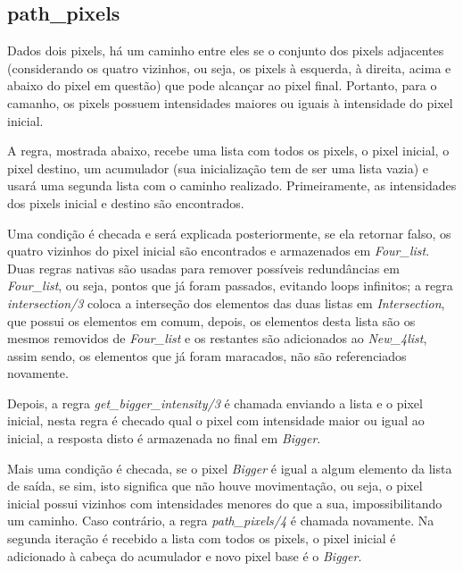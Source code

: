 \documentclass{article}
\begin{document}
    \newpage
    \subsection*{path\_pixels}
        Dados dois pixels, há um caminho entre eles se o conjunto dos pixels adjacentes (considerando os quatro vizinhos, ou seja, os pixels à esquerda, à direita, acima e abaixo do pixel em questão) que pode alcançar ao pixel final. Portanto, para o camanho, os pixels possuem intensidades maiores ou iguais à intensidade do pixel inicial.
        
        A regra, mostrada abaixo, recebe uma lista com todos os pixels, o pixel inicial, o pixel destino, um acumulador (sua inicialização tem de ser uma lista vazia) e usará uma segunda lista com o caminho realizado. Primeiramente, as intensidades dos pixels inicial e destino são encontrados.
        
        Uma condição é checada e será explicada posteriormente, se ela retornar falso, os quatro vizinhos do pixel inicial são encontrados e armazenados em \textit{Four\_list}. Duas regras nativas são usadas para remover possíveis redundâncias em \textit{Four\_list}, ou seja, pontos que já foram passados, evitando loops infinitos; a regra \textit{intersection/3} coloca a interseção dos elementos das duas listas em \textit{Intersection}, que possui os elementos em comum, depois, os elementos desta lista são os mesmos removidos de \textit{Four\_list} e os restantes são adicionados ao \textit{New\_4list}, assim sendo, os elementos que já foram maracados, não são referenciados novamente.
        
        Depois, a regra \textit{get\_bigger\_intensity/3} é chamada enviando a lista e o pixel inicial, nesta regra é checado qual o pixel com intensidade maior ou igual ao inicial, a resposta disto é armazenada no final em \textit{Bigger}.
        
        Mais uma condição é checada, se o pixel \textit{Bigger} é igual a algum elemento da lista de saída, se sim, isto significa que não houve movimentação, ou seja, o pixel inicial possui vizinhos com intensidades menores do que a sua, impossibilitando um caminho. Caso contrário, a regra \textit{path\_pixels/4} é chamada novamente. Na segunda iteração é recebido a lista com todos os pixels, o pixel inicial é adicionado à cabeça do acumulador e novo pixel base é o \textit{Bigger}.
        
\end{document}
